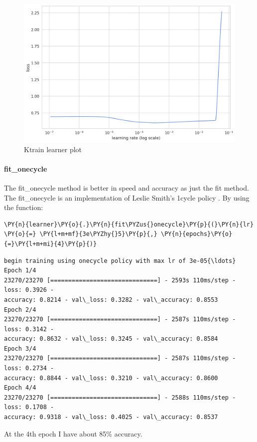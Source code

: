 \begin{figure}[ht!]
\centering
\includegraphics[width=1\textwidth]{images/output_97_0.png}
\caption{Ktrain learner plot}
\label{fig:fig_29}
\end{figure}
\FloatBarrier

\paragraph{fit\_onecycle}
The fit\_onecycle method is better in speed and accuracy as just the fit method.
The fit\_onecycle is an implementation of Leslie Smith’s 1cycle policy \cite{smith_disciplined_2018}.
By using the function:
    \begin{tcolorbox}[breakable, size=fbox, boxrule=1pt, pad at break*=1mm,colback=cellbackground, colframe=cellborder]
\begin{Verbatim}[commandchars=\\\{\},fontsize=\footnotesize]
\PY{n}{learner}\PY{o}{.}\PY{n}{fit\PYZus{}onecycle}\PY{p}{(}\PY{n}{lr} \PY{o}{=} \PY{l+m+mf}{3e\PYZhy{}5}\PY{p}{,} \PY{n}{epochs}\PY{o}{=}\PY{l+m+mi}{4}\PY{p}{)}
\end{Verbatim}
\end{tcolorbox}

 \begin{Verbatim}[commandchars=\\\{\},fontsize=\footnotesize]
begin training using onecycle policy with max lr of 3e-05{\ldots}
Epoch 1/4
23270/23270 [==============================] - 2593s 110ms/step - loss: 0.3926 -
accuracy: 0.8214 - val\_loss: 0.3282 - val\_accuracy: 0.8553
Epoch 2/4
23270/23270 [==============================] - 2587s 110ms/step - loss: 0.3142 -
accuracy: 0.8632 - val\_loss: 0.3245 - val\_accuracy: 0.8584
Epoch 3/4
23270/23270 [==============================] - 2587s 110ms/step - loss: 0.2734 -
accuracy: 0.8844 - val\_loss: 0.3210 - val\_accuracy: 0.8600
Epoch 4/4
23270/23270 [==============================] - 2588s 110ms/step - loss: 0.1708 -
accuracy: 0.9318 - val\_loss: 0.4025 - val\_accuracy: 0.8537
    \end{Verbatim}
At the 4th epoch I have about 85\% accuracy.

